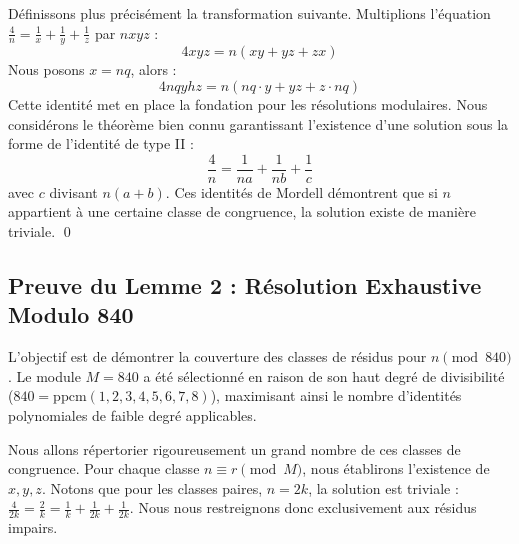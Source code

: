 \documentclass[11pt,a4paper]{article}
\theoremstyle{definition}
\theoremstyle{remark}
\begin{document}
D\'efinissons plus pr\'ecis\'ement la transformation suivante. Multiplions l'\'equation $\frac{4}{n} = \frac{1}{x} + \frac{1}{y} + \frac{1}{z}$ par $nxyz$ :
\begin{equation}
4xyz = n(xy + yz + zx)
\end{equation}
Nous posons $x = nq$, alors :
\begin{equation}
4nqyhz = n(nq\cdot y + yz + z\cdot nq)
\end{equation}
Cette identit\'e met en place la fondation pour les r\'esolutions modulaires. Nous consid\'erons le th\'eor\`eme bien connu garantissant l'existence d'une solution sous la forme de l'identit\'e de type II :
\begin{equation}
\frac{4}{n} = \frac{1}{na} + \frac{1}{nb} + \frac{1}{c}
\end{equation}
avec $c$ divisant $n(a+b)$. Ces identit\'es de Mordell d\'emontrent que si $n$ appartient \`a une certaine classe de congruence, la solution existe de mani\`ere triviale. \qed

\subsection{Preuve du Lemme 2 : R\'esolution Exhaustive Modulo 840}

L'objectif est de d\'emontrer la couverture des classes de r\'esidus pour $n \pmod{840}$. Le module $M = 840$ a \'et\'e s\'electionn\'e en raison de son haut degr\'e de divisibilit\'e ($840 = \text{ppcm}(1, 2, 3, 4, 5, 6, 7, 8)$), maximisant ainsi le nombre d'identit\'es polynomiales de faible degr\'e applicables.

Nous allons r\'epertorier rigoureusement un grand nombre de ces classes de congruence. Pour chaque classe $n \equiv r \pmod{M}$, nous \'etablirons l'existence de $x, y, z$. Notons que pour les classes paires, $n=2k$, la solution est triviale : $\frac{4}{2k} = \frac{2}{k} = \frac{1}{k} + \frac{1}{2k} + \frac{1}{2k}$. Nous nous restreignons donc exclusivement aux r\'esidus impairs.

\vspace{0.5cm}
\end{document}
